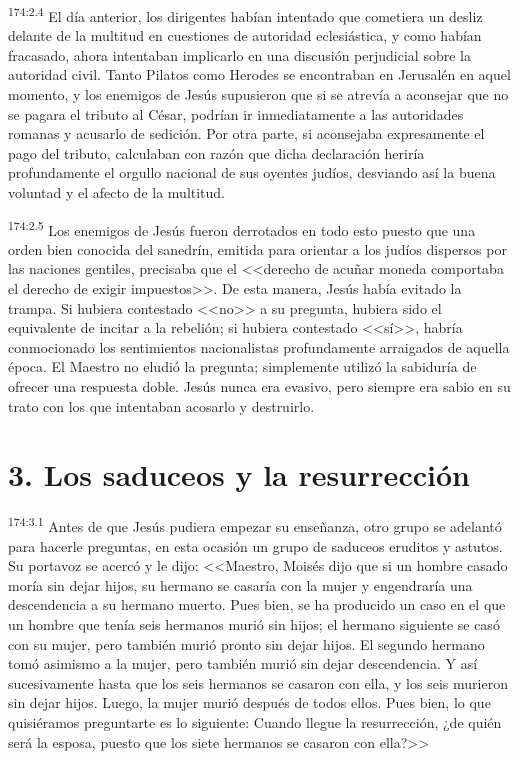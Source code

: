 \par 
\textsuperscript{174:2.4} El día anterior, los dirigentes habían intentado que cometiera un desliz delante de la multitud en cuestiones de autoridad eclesiástica, y como habían fracasado, ahora intentaban implicarlo en una discusión perjudicial sobre la autoridad civil. Tanto Pilatos como Herodes se encontraban en Jerusalén en aquel momento, y los enemigos de Jesús supusieron que si se atrevía a aconsejar que no se pagara el tributo al César, podrían ir inmediatamente a las autoridades romanas y acusarlo de sedición. Por otra parte, si aconsejaba expresamente el pago del tributo, calculaban con razón que dicha declaración heriría profundamente el orgullo nacional de sus oyentes judíos, desviando así la buena voluntad y el afecto de la multitud.

\par 
\textsuperscript{174:2.5} Los enemigos de Jesús fueron derrotados en todo esto puesto que una orden bien conocida del sanedrín, emitida para orientar a los judíos dispersos por las naciones gentiles, precisaba que el <<derecho de acuñar moneda comportaba el derecho de exigir impuestos>>. De esta manera, Jesús había evitado la trampa. Si hubiera contestado <<no>> a su pregunta, hubiera sido el equivalente de incitar a la rebelión; si hubiera contestado <<sí>>, habría conmocionado los sentimientos nacionalistas profundamente arraigados de aquella época. El Maestro no eludió la pregunta; simplemente utilizó la sabiduría de ofrecer una respuesta doble. Jesús nunca era evasivo, pero siempre era sabio en su trato con los que intentaban acosarlo y destruirlo.

\section*{3. Los saduceos y la resurrección}
\par 
\textsuperscript{174:3.1} Antes de que Jesús pudiera empezar su enseñanza, otro grupo se adelantó para hacerle preguntas, en esta ocasión un grupo de saduceos eruditos y astutos. Su portavoz se acercó y le dijo: <<Maestro, Moisés dijo que si un hombre casado moría sin dejar hijos, su hermano se casaría con la mujer y engendraría una descendencia a su hermano muerto. Pues bien, se ha producido un caso en el que un hombre que tenía seis hermanos murió sin hijos; el hermano siguiente se casó con su mujer, pero también murió pronto sin dejar hijos. El segundo hermano tomó asimismo a la mujer, pero también murió sin dejar descendencia. Y así sucesivamente hasta que los seis hermanos se casaron con ella, y los seis murieron sin dejar hijos. Luego, la mujer murió después de todos ellos. Pues bien, lo que quisiéramos preguntarte es lo siguiente: Cuando llegue la resurrección, ¿de quién será la esposa, puesto que los siete hermanos se casaron con ella?>>

